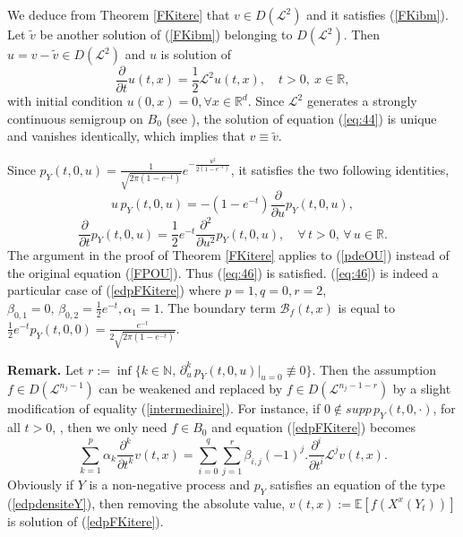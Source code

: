 \documentclass[a4paper, 11pt]{article}
\newenvironment{rmq}{\smallskip \noindent\textbf{Remark.}}{}
\newcommand{\N}{\mathbb{N}}
\newcommand{\R}{\mathbb{R}}
\newcommand{\E}{\mathbb{E}}
\newcommand{\1}{\mathbf{1}}
\begin{document}
We deduce from Theorem \ref{FKitere} that $v\in D(\mathcal{L}^2)$ and it satisfies (\ref{FKibm}). Let $\tilde{v}$ be another solution of  (\ref{FKibm}) belonging to $D(\mathcal{L}^2)$. Then $u=v-\tilde{v}\in D(\mathcal{L}^2)$ and $u$ is solution of
\begin{equation}
\label{eq:44}
\frac{\partial}{\partial t}u(t,x)=\frac{1}{2}\mathcal{L}^2u(t,x), \quad t>0,\ x\in\R,
\end{equation}
with initial condition $u(0,x)=0, \forall x\in \R^d$. Since $\mathcal{L}^2$ generates a strongly continuous semigroup on $B_0$ (see \cite{nag86}), the solution of equation (\ref{eq:44}) is unique and vanishes identically, which implies that $v\equiv \tilde{v}$.\hfill \framebox[0.6em]




\bigskip

Since $p_Y(t,0,u)=\frac{1}{\sqrt{2\pi(1-e^{-t})}}e^{-\frac{u^2}{2(1-e^{-t})}}$, it satisfies the two following identities,
\begin{equation*}
u\,  p_Y(t,0,u)=-(1-e^{-t})\frac{\partial}{\partial u}p_Y(t,0,u),
\end{equation*}
\begin{equation}\label{pdeOU}
\frac{\partial}{\partial t}p_Y(t,0,u)=\frac{1}{2}e^{-t}\frac{\partial^2}{\partial u^2}p_Y(t,0,u), \quad \forall\,  t>0,\, \forall\,  u\in \R.
\end{equation}
The argument in the proof of Theorem \ref{FKitere} applies to (\ref{pdeOU}) instead of the original equation (\ref{FPOU}). Thus (\ref{eq:46}) is satisfied. (\ref{eq:46}) is indeed a particular case of (\ref{edpFKitere}) where $p=1, q=0, r=2$, $\beta_{0,1}=0,\, \beta_{0,2}=\frac{1}{2}e^{-t}, \alpha_1=1$. The boundary term $\mathcal{B}_f(t,x)$ is equal to $\frac{1}{2}e^{-t}p_Y(t,0,0)=\frac{e^{-t}}{2\sqrt{2\pi(1-e^{-t})}}.$ \hfill \framebox[0.6em]{}



\begin{rmq}
Let $r:=\inf \{k\in \N,\, \partial^k_u \, p_Y(t,0,u)|_{u=0}\not \equiv 0\}$. Then the assumption $f\in D(\mathcal{L}^{n_j-1})$ can be weakened and replaced by $f\in D(\mathcal{L}^{n_j-1-r})$ by a slight modification of equality (\ref{intermediaire}). For instance, if $0\not \in supp\, p_Y(t,0,\cdot) $, for all $t>0$, , then we only need $f\in B_0$ and equation (\ref{edpFKitere}) becomes
\begin{equation*}
\sum_{k=1}^p \alpha_k \frac{\partial^k}{\partial t^k}v(t,x)=\sum_{i=0}^{q}\sum_{j=1}^{r} \beta_{i,j}(-1)^j.\frac{\partial^i}{\partial t^i}\mathcal{L}^jv(t,x).
\end{equation*}
Obviously if $Y$ is a non-negative process and $p_Y$ satisfies an equation of the type (\ref{edpdensiteY}), then removing the absolute value, $v(t,x):=\E \left[f(X^x(Y_t))\right]$ is solution of (\ref{edpFKitere}).
\end{rmq}
\end{document}
